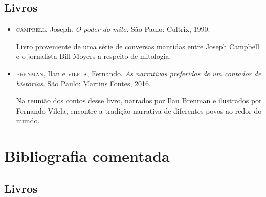 \documentclass[11pt]{extarticle}
\begin{document}
\subsection{Livros} 

\begin{itemize}
\item \textsc{campbell}, Joseph. \textit{O poder do mito}. São Paulo: Cultrix, 1990.

Livro proveniente de uma série de conversas mantidas entre Joseph Campbell e o jornalista Bill Moyers a respeito de mitologia.

\item \textsc{brenman}, Ilan e \textsc{vilela}, Fernando. \textit{As narrativas preferidas de um contador de histórias}. São Paulo: Martins Fontes, 2016.

Na reunião dos contos desse livro, narrados por Ilan Brenman e ilustrados por Fernando Vilela, encontre a tradição narrativa de diferentes povos ao redor do mundo.

\end{itemize}

\section{Bibliografia comentada}
\subsection{Livros}
\end{document}
